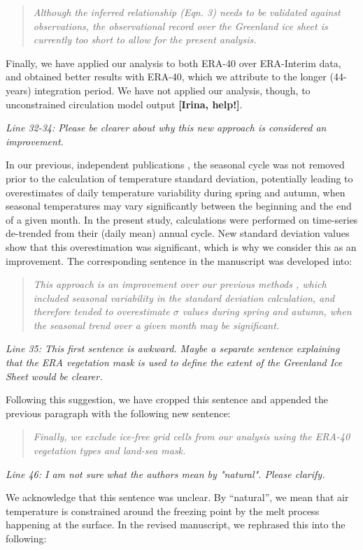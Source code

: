 \documentclass[10pt]{article}
\def\referee#1{\bigskip\textcolor{blue!50!black}{\textit{#1}}}
\def\msquote#1{\begin{quote}\textit{#1}\end{quote}}
\begin{document}
\msquote{Although the inferred relationship (Eqn. 3) needs to be validated against observations, the observational record over the Greenland ice sheet is currently too short to allow for the present analysis.}

Finally, we have applied our analysis to both ERA-40 over ERA-Interim data, and obtained better results with ERA-40, which we attribute to the longer (44-years) integration period. We have not applied our analysis, though, to unconstrained circulation model output \textbf{[Irina, help!]}.

\referee{Line 32-34: Please be clearer about why this new approach is considered an improvement.}

In our previous, independent publications \citep{seguinot-2013,rogozhina-rau-2014}, the seasonal cycle was not removed prior to the calculation of temperature standard deviation, potentially leading to overestimates of daily temperature variability during spring and autumn, when seasonal temperatures may vary significantly between the beginning and the end of a given month. In the present study, calculations were performed on time-series de-trended from their (daily mean) annual cycle. New standard deviation values show that this overestimation was significant, which is why we consider this as an improvement. The corresponding sentence in the manuscript was developed into:

\msquote{This approach is an improvement over our previous methods \citep{seguinot-2013,rogozhina-rau-2014}, which included seasonal variability in the standard deviation calculation, and therefore tended to overestimate $\sigma$ values during spring and autumn, when the seasonal trend over a given month may be significant.}

\referee{Line 35: This first sentence is awkward. Maybe a separate sentence explaining that the ERA vegetation mask is used to define the extent of the Greenland Ice Sheet would be clearer.}

Following this suggestion, we have cropped this sentence and appended the previous paragraph with the following new sentence:

\msquote{Finally, we exclude ice-free grid cells from our analysis using the ERA-40 vegetation types and land-sea mask.}

\referee{Line 46: I am not sure what the authors mean by "natural". Please clarify.}

We acknowledge that this sentence was unclear. By ``natural'', we mean that air temperature is constrained around the freezing point by the melt process happening at the surface. In the revised manuscript, we rephrased this into the following:
\end{document}
